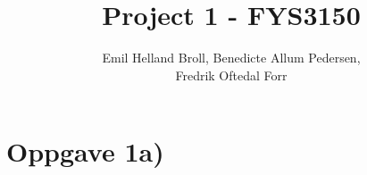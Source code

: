 \documentclass{article}
\title{Project 1 - FYS3150}\vspace{-3ex}
\author{Emil Helland Broll, Benedicte Allum Pedersen,\\ Fredrik Oftedal Forr}
\date{\vspace{-5ex}}
\begin{document}
\maketitle

\section*{Oppgave 1a)}
\end{document}
